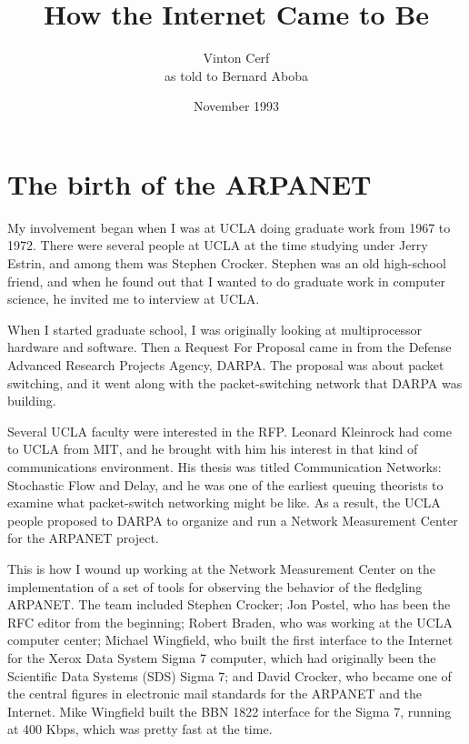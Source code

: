 \documentclass[10pt,a4paper]{scrartcl}
\begin{document}
\title{How the Internet Came to Be}
\author{Vinton Cerf \\ {\small as told to Bernard Aboba}}
\date{November 1993}

\maketitle

{\section {The birth of the ARPANET}}

My involvement began when I was at UCLA doing graduate work from 1967 to 1972. There were several people at UCLA at the time studying under Jerry Estrin, and among them was Stephen Crocker. Stephen was an old high-school friend, and when he found out that I wanted to do graduate work in computer science, he invited me to interview at UCLA.

When I started graduate school, I was originally looking at multiprocessor hardware and software. Then a Request For Proposal came in from the Defense Advanced Research Projects Agency, DARPA. The proposal was about packet switching, and it went along with the packet-switching network that DARPA was building.

Several UCLA faculty were interested in the RFP. Leonard Kleinrock had come to UCLA from MIT, and he brought with him his interest in that kind of communications environment. His thesis was titled Communication Networks: Stochastic Flow and Delay, and he was one of the earliest queuing theorists to examine what packet-switch networking might be like. As a result, the UCLA people proposed to DARPA to organize and run a Network Measurement Center for the ARPANET project.

This is how I wound up working at the Network Measurement Center on the implementation of a set of tools for observing the behavior of the fledgling ARPANET. The team included Stephen Crocker; Jon Postel, who has been the RFC editor from the beginning; Robert Braden, who was working at the UCLA computer center; Michael Wingfield, who built the first interface to the Internet for the Xerox Data System Sigma 7 computer, which had originally been the Scientific Data Systems (SDS) Sigma 7; and David Crocker, who became one of the central figures in electronic mail standards for the ARPANET and the Internet. Mike Wingfield built the BBN 1822 interface for the Sigma 7, running at 400 Kbps, which was pretty fast at the time.
\end{document}
